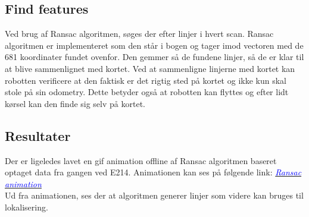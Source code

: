 \subsection{Find features}
Ved brug af Ransac algoritmen, søges der efter linjer i hvert scan. Ransac algoritmen er implementeret som den står i bogen og tager imod vectoren med de 681 koordinater fundet ovenfor. Den gemmer så de fundene linjer, så de er klar til at blive sammenlignet med kortet. Ved at sammenligne linjerne med kortet kan robotten verificere at den faktisk er det rigtig sted på kortet og ikke kun skal stole på sin odometry. Dette betyder også at robotten kan flyttes og efter lidt kørsel kan den finde sig selv på kortet.

\subsection{Resultater}
Der er ligeledes lavet en gif animation offline af Ransac algoritmen baseret optaget data fra gangen ved E214. Animationen kan ses på følgende link: \href{https://www.dropbox.com/s/5u5d27s73241f2i/ransac.gif?n=110116599}{\textcolor{blue}{\textit{Ransac animation}}}\\
Ud fra animationen, ses der at algoritmen generer linjer som videre kan bruges til lokalisering.

